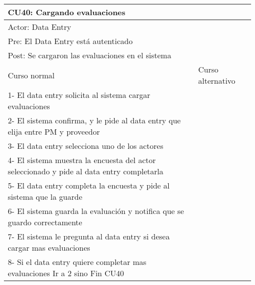\begin{table}[H]
  \begin{adjustbox}{max width = \textwidth}
  \begin{tabular}{|l|l|}
    \hline
    \multicolumn{2}{|l|}{CU40: Cargando evaluaciones} \\\hline
    \multicolumn{2}{|l|}{Actor: Data Entry} \\\hline
    \multicolumn{2}{|l|}{Pre: El Data Entry está autenticado} \\\hline
    \multicolumn{2}{|l|}{Post: Se cargaron las evaluaciones en el sistema} \\\hline
     Curso normal & Curso alternativo\\ \hline
	 1- El data entry solicita al sistema cargar evaluaciones & \\ \hline
	 2- El sistema confirma, y le pide al data entry que elija entre PM y proveedor & \\ \hline
	 3- El data entry selecciona uno de los actores & \\ \hline
     4- El sistema muestra la encuesta del actor seleccionado y pide al data entry completarla & \\ \hline
     5- El data entry completa la encuesta y pide al sistema que la guarde & \\ \hline
	 6- El sistema guarda la evaluación y notifica que se guardo correctamente& \\ \hline
     7- El sistema le pregunta al data entry si desea cargar mas evaluaciones & \\ \hline
	 8- Si el data entry quiere completar mas evaluaciones Ir a 2 sino Fin CU40 & \\ \hline
  \end{tabular}
  \end{adjustbox}
\end{table}


